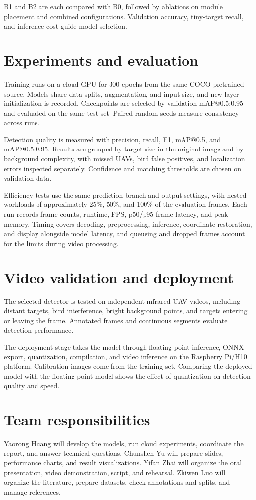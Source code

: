 \documentclass[lettersize,journal]{IEEEtran}
\begin{document}
B1 and B2 are each compared with B0, followed by ablations on module placement and combined configurations. Validation accuracy, tiny-target recall, and inference cost guide model selection.

\IEEEpubidadjcol

\section{Experiments and evaluation}
Training runs on a cloud GPU for 300 epochs from the same COCO-pretrained source. Models share data splits, augmentation, and input size, and new-layer initialization is recorded. Checkpoints are selected by validation mAP@0.5:0.95 and evaluated on the same test set. Paired random seeds measure consistency across runs.

Detection quality is measured with precision, recall, F1, mAP@0.5, and mAP@0.5:0.95. Results are grouped by target size in the original image and by background complexity, with missed UAVs, bird false positives, and localization errors inspected separately. Confidence and matching thresholds are chosen on validation data.

Efficiency tests use the same prediction branch and output settings, with nested workloads of approximately 25\%, 50\%, and 100\% of the evaluation frames. Each run records frame counts, runtime, FPS, p50/p95 frame latency, and peak memory. Timing covers decoding, preprocessing, inference, coordinate restoration, and display alongside model latency, and queueing and dropped frames account for the limits during video processing.

\section{Video validation and deployment}
The selected detector is tested on independent infrared UAV videos, including distant targets, bird interference, bright background points, and targets entering or leaving the frame. Annotated frames and continuous segments evaluate detection performance.

The deployment stage takes the model through floating-point inference, ONNX export, quantization, compilation, and video inference on the Raspberry Pi/H10 platform. Calibration images come from the training set. Comparing the deployed model with the floating-point model shows the effect of quantization on detection quality and speed.

\section{Team responsibilities}
Yaorong Huang will develop the models, run cloud experiments, coordinate the report, and answer technical questions. Chunshen Yu will prepare slides, performance charts, and result visualizations. Yifan Zhai will organize the oral presentation, video demonstration, script, and rehearsal. Zhiwen Luo will organize the literature, prepare datasets, check annotations and splits, and manage references.


\end{document}

